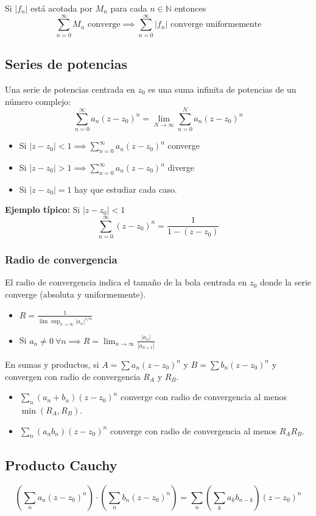 \documentclass[paper=a4, fontsize=11pt]{scrartcl}
\numberwithin{equation}{section}
\numberwithin{figure}{section}
\numberwithin{table}{section}
\begin{document}
Si $|f_n|$ está acotada por $M_n$ para cada $n\in\mathbb{N}$ entonces
$$\sum_{n=0}^\infty M_n \text{ converge} \implies \sum_{n=0}^\infty |f_n| \text{ converge uniformemente}$$


\subsection{Series de potencias}
Una serie de potencias centrada en $z_0$ es una suma infinita de potencias de un número complejo:
$$\sum_{n=0}^\infty a_n(z-z_0)^n = \lim_{N\to\infty}\sum_{n=0}^N a_n(z-z_0)^n$$

\begin{itemize}
\item Si $|z-z_0|<1 \implies \sum_{n=0}^\infty a_n(z-z_0)^n$ converge
\item Si $|z-z_0|>1 \implies \sum_{n=0}^\infty a_n(z-z_0)^n$ diverge
\item Si $|z-z_0|=1$ hay que estudiar cada caso.
\end{itemize}

\textbf{Ejemplo típico:}
Si $|z-z_0|<1$
$$\boxed{\sum_{n=0}^\infty (z-z_0)^n = \frac{1}{1-(z-z_0)}}$$

\subsubsection{Radio de convergencia}
El radio de convergencia indica el tamaño de la bola centrada en $z_0$ donde la serie converge (absoluta y uniformemente).
\begin{itemize}
\item $\boxed{R = \frac{1}{\lim \sup_{n\to \infty} |a_n|^{1/n}}}$
\item Si $a_n\neq 0 \ \forall n \implies \boxed{R = \lim_{n\to\infty}\frac{|a_{n}|}{|a_{n+1}|}}$
\end{itemize}

En sumas y productos, si $A = \sum a_n(z-z_0)^n$ y $B = \sum b_n(z-z_0)^n$ y convergen con radio de convergencia $R_A$ y $R_B$.
\begin{itemize}
\item $\sum_n (a_n+b_n)(z-z_0)^n$ converge con radio de convergencia al menos $\min(R_A, R_B)$.
\item $\sum_n (a_nb_n)(z-z_0)^n$ converge con radio de convergencia al menos $R_AR_B$.
\end{itemize}

\subsection{Producto Cauchy}
$$\left(\sum_n a_n(z-z_0)^n\right)\cdot\left(\sum_n b_n(z-z_0)^n\right) = \sum_n\left(\sum_k a_kb_{n-k}\right)(z-z_0)^n$$
\end{document}

